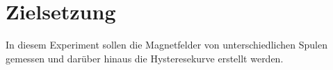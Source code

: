 \section{Zielsetzung}
\label{sec:Zielsetzung}

In diesem Experiment sollen die Magnetfelder von unterschiedlichen Spulen 
gemessen und darüber hinaus die Hysteresekurve erstellt werden.